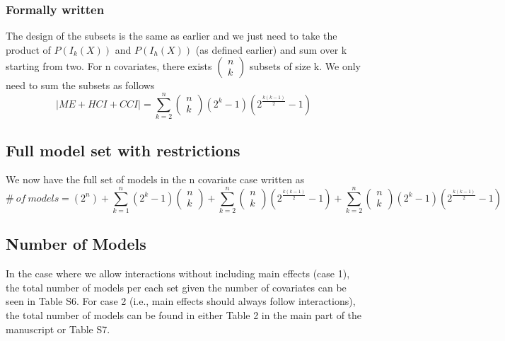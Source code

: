 \subsubsection{Formally written}
The design of the subsets is the same as earlier and we just need to take the product of
$P\left(I_k\left(X\right)\right)$ and $P\left(I_h\left(X\right)\right)$ (as defined earlier)  and sum over k starting from two.
For n covariates, there exists $\left( \begin{array}{c}
n \\ 
k \end{array}
\right)$ subsets of size k. We only need to sum the subsets as follows
\[|ME+HCI+CCI|=\sum^n_{k=2}{\left( \begin{array}{c}
n \\ 
k \end{array}
\right)\left(2^k-1\right)\left(2^{\frac{k\left(k-1\right)}{2}}-1\right)}\] 

\subsection{Full model set with restrictions}
We now have the full set of models in the n covariate case written as
\[\#\ of\ models=\left(2^n\right)+\sum^n_{k=1}{\left(2^k-1\right)\left( \begin{array}{c}
n \\ 
k \end{array}
\right)}+\sum^n_{k=2}{\left( \begin{array}{c}
n \\ 
k \end{array}
\right)\left(2^{\frac{k\left(k-1\right)}{2}}-1\right)}+\sum^n_{k=2}{\left( \begin{array}{c}
n \\ 
k \end{array}
\right)\left(2^k-1\right)\left(2^{\frac{k\left(k-1\right)}{2}}-1\right)}\] 
\subsection{Number of Models}

\noindent In the case where we allow interactions without including main effects (case 1), the total number of models per each set given the number of covariates can be seen in Table S6. For case 2 (i.e., main effects should always follow interactions), the total number of models can be found in either Table 2 in the main part of the manuscript or Table S7. 

